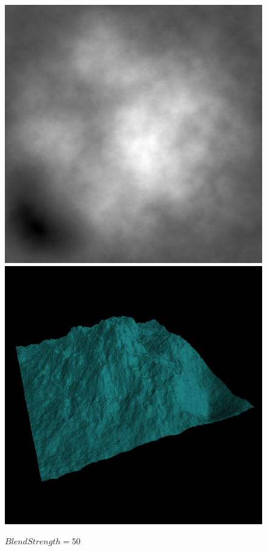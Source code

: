 	\begin{figure}[H]
	  \centering
	  \includegraphics[width=\imagewidth]{images/results/terrains/512-1/blending/bs_50}
	  \includegraphics[width=\imagewidth]{images/results/terrains/512-1/blending/bs_50_3d}
	  \caption{$BlendStrength = 50$}
	  \label{fig:ex-bs50-surface}
	\end{figure}
	
